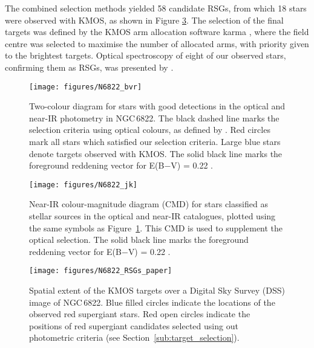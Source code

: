 \documentclass[iop]{emulateapj}
\begin{document}
The combined selection methods yielded 58 candidate RSGs, from which 18 stars were observed with KMOS, as shown in Figure
\ref{fig:N6822}.
The selection of the final targets was defined by the KMOS arm allocation software {\sc karma}
\citep{2008SPIE.7019E..0TW},
where the field centre was selected to maximise the number of allocated arms,
with priority given to the brightest targets.
Optical spectroscopy of eight of our observed stars, confirming them as RSGs, was presented by
\cite{2012AJ....144....2L}.


\begin{figure}
 \texttt{[image: figures/N6822\_bvr]}
 \caption{
          Two-colour diagram for stars with good detections in the optical and near-IR photometry in NGC\,6822.
          The black dashed line marks the selection criteria using optical colours, as defined by
          \protect\cite{2012AJ....144....2L}.
          Red circles mark all stars which satisfied our selection criteria.
          Large blue stars denote targets observed with KMOS.
          The solid black line marks the foreground reddening vector for E(B$-$V) = 0.22
          \protect\citep{1998ApJ...500..525S}.
         }
 \label{fig:BVR}
\end{figure}

\begin{figure}
 \texttt{[image: figures/N6822\_jk]}
 \caption{
          Near-IR colour-magnitude diagram (CMD) for stars classified as stellar sources in the optical and near-IR catalogues, plotted using the same symbols as Figure~\ref{fig:BVR}.
          This CMD is used to supplement the optical selection.
          The solid black line marks the foreground reddening vector for E(B$-$V) = 0.22
          \protect\citep{1998ApJ...500..525S}.
         }
 \label{fig:JK}
\end{figure}


\begin{figure}
 \texttt{[image: figures/N6822\_RSGs\_paper]}
 \caption{Spatial extent of the KMOS targets over a Digital Sky Survey (DSS) image of NGC\,6822.
          Blue filled circles indicate the locations of the observed red supergiant stars.
          Red open circles indicate the positions of red supergiant candidates selected using out photometric criteria (see Section~\ref{sub:target_selection}).
          }
 \label{fig:N6822}
\end{figure}
\end{document}
